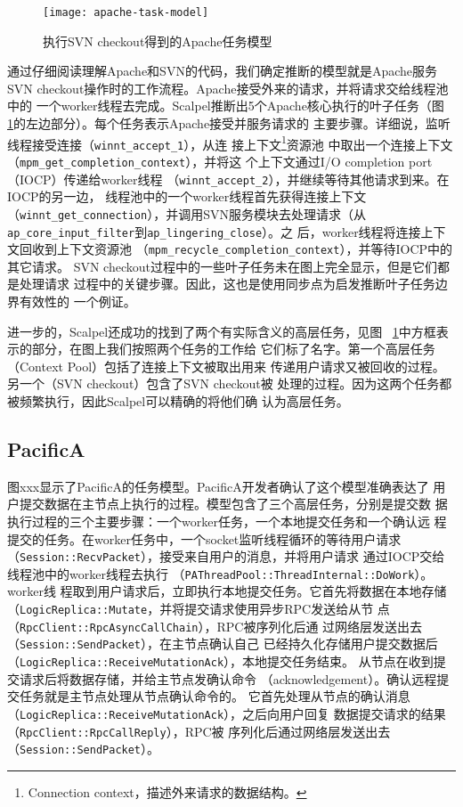 \begin{figure}
\centering
\texttt{[image: apache-task-model]}
\caption{执行SVN checkout得到的Apache任务模型}
\label{fig:apache_model}
\end{figure}


通过仔细阅读理解Apache和SVN的代码，我们确定推断的模型就是Apache服务SVN
checkout操作时的工作流程。Apache接受外来的请求，并将请求交给线程池中的
一个worker线程去完成。Scalpel推断出5个Apache核心执行的叶子任务（图~
\ref{fig:apache_model}的左边部分）。每个任务表示Apache接受并服务请求的
主要步骤。详细说，监听线程接受连接（\texttt{winnt\_accept\_1}），从连
接上下文\footnote{Connection context，描述外来请求的数据结构。}资源池
中取出一个连接上下文（\texttt{mpm\_get\_completion\_context}），并将这
个上下文通过I/O completion port（IOCP）传递给worker线程
（\texttt{winnt\_accept\_2}），并继续等待其他请求到来。在IOCP的另一边，
线程池中的一个worker线程首先获得连接上下文
（\texttt{winnt\_get\_connection}），并调用SVN服务模块去处理请求（从
\texttt{ap\_core\_input\_filter}到\texttt{ap\_lingering\_close}）。之
后，worker线程将连接上下文回收到上下文资源池
（\texttt{mpm\_recycle\_completion\_context}），并等待IOCP中的其它请求。
SVN checkout过程中的一些叶子任务未在图上完全显示，但是它们都是处理请求
过程中的关键步骤。因此，这也是使用同步点为启发推断叶子任务边界有效性的
一个例证。

进一步的，Scalpel还成功的找到了两个有实际含义的高层任务，见图~
\ref{fig:apache_model}中方框表示的部分，在图上我们按照两个任务的工作给
它们标了名字。第一个高层任务（Context Pool）包括了连接上下文被取出用来
传递用户请求又被回收的过程。另一个（SVN checkout）包含了SVN checkout被
处理的过程。因为这两个任务都被频繁执行，因此Scalpel可以精确的将他们确
认为高层任务。

\subsection{PacificA}


图xxx显示了PacificA的任务模型。PacificA开发者确认了这个模型准确表达了
用户提交数据在主节点上执行的过程。模型包含了三个高层任务，分别是提交数
据执行过程的三个主要步骤：一个worker任务，一个本地提交任务和一个确认远
程提交的任务。在worker任务中，一个socket监听线程循环的等待用户请求
（\texttt{Session\-::Recv\-Packet}），接受来自用户的消息，并将用户请求
通过IOCP交给线程池中的worker线程去执行
（\texttt{PA\-Thread\-Pool\-::Thread\-Internal\-::DoWork}）。worker线
程取到用户请求后，立即执行本地提交任务。它首先将数据在本地存储
（\texttt{Logic\-Replica\-::Mutate}，并将提交请求使用异步RPC发送给从节
点（\texttt{Rpc\-Client\-::Rpc\-Async\-Call\-Chain}），RPC被序列化后通
过网络层发送出去（\texttt{Session\-::Send\-Packet}），在主节点确认自己
已经持久化存储用户提交数据后
（\texttt{Logic\-Replica\-::Receive\-MutationAck}），本地提交任务结束。
从节点在收到提交请求后将数据存储，并给主节点发确认命令
（acknowledgement）。确认远程提交任务就是主节点处理从节点确认命令的。
它首先处理从节点的确认消息
（\texttt{Logic\-Replica\-::Receive\-Mutation\-Ack}），之后向用户回复
数据提交请求的结果（\texttt{Rpc\-Client\-::Rpc\-Call\-Reply}），RPC被
序列化后通过网络层发送出去（\texttt{Session\-::Send\-Packet}）。

